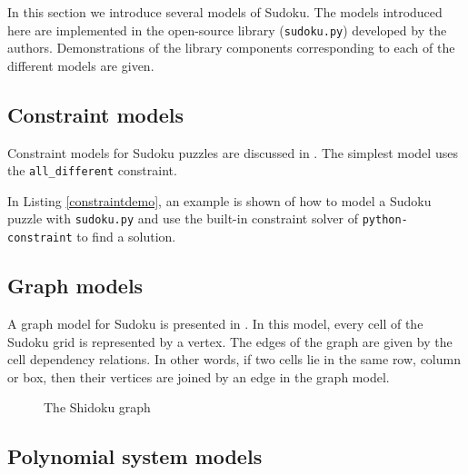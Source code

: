 In this section we introduce several models of Sudoku. The models introduced here are implemented in the open-source library (\texttt{sudoku.py}) developed by the authors. Demonstrations of the library components corresponding to each of the different models are given.

\begin{center}
 \librarytable
\end{center}

\subsection{Constraint models}
\label{sec:models:constraints}

Constraint models for Sudoku puzzles are discussed in \cite{simonissudoku}. The simplest model uses the \texttt{all\_different} constraint.

In Listing \ref{constraintdemo}, an example is shown of how to model a Sudoku puzzle with \texttt{sudoku.py} and use the built-in constraint solver of \texttt{python-constraint} to find a solution.



\subsection{Graph models}
\label{sec:models:graph}

A graph model for Sudoku is presented in \cite{gagovargaset}. In this model, every cell of the Sudoku grid is represented by a vertex. The edges of the graph are given by the cell dependency relations. In other words, if two cells lie in the same row, column or box, then their vertices are joined by an edge in the graph model.

\begin{figure}[h]
\centering
\begin{dot2tex}[circo,mathmode,options={--graphstyle "scale=0.40"}]
  
\end{dot2tex}
\caption{The Shidoku graph}
\end{figure}

\subsection{Polynomial system models}
\label{sec:models:polynomials}

